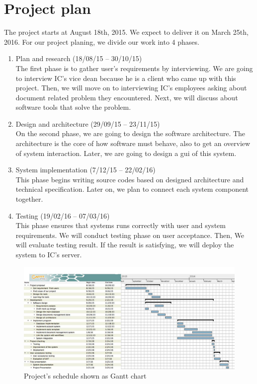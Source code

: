 \section{Project plan}
The project starts at August 18th, 2015.
We expect to deliver it on March 25th, 2016.
For our project planing, we divide our work into 4 phases.
\begin{enumerate}
\item Plan and research (18/08/15 -- 30/10/15) \hfill \\
The first phase is to gather user's requirements by interviewing.
We are going to interview IC's vice dean because he is a client who came up with this project.
Then, we will move on to interviewing IC's employees asking about document related problem they encountered.
Next, we will discuss about software tools that solve the problem.
\item Design and architecture (29/09/15 -- 23/11/15) \hfill \\
On the second phase, we are going to design the software architecture.
The architecture is the core of how software must behave, also to get an overview of system interaction.
Later, we are going to design a \gls{gui} of this system.
\item System implementation (7/12/15 -- 22/02/16) \hfill \\
This phase begins writing source codes based on designed architecture and technical specification.
Later on, we plan to connect each system component together.
\item Testing (19/02/16 -- 07/03/16) \hfill \\
This phase ensures that systems runs correctly with user and system requirements.
We will conduct testing phase on user acceptance.
Then, We will evaluate testing result.
If the result is satisfying, we will deploy the system to IC's server.
\end{enumerate}

\begin{landscape}
\begin{figure}
\centering
\caption{Project's schedule shown as Gantt chart}
\label{fig:project-schedule}
\includegraphics[scale=0.45]{res/project_plan}
\end{figure}
\end{landscape}